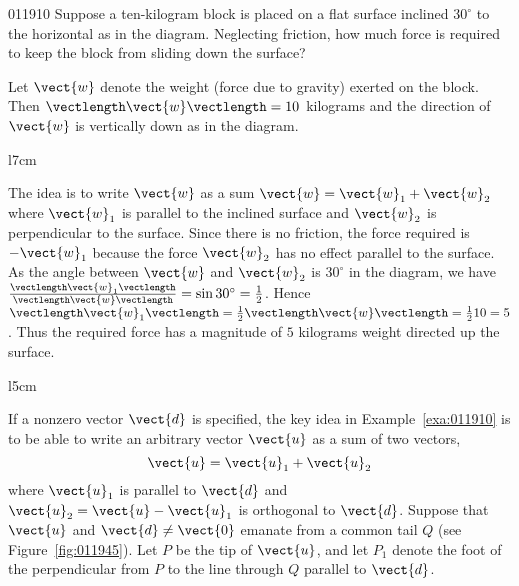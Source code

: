 \begin{example}{}{011910}
Suppose  a ten-kilogram block is placed on a flat surface inclined $30^{\circ}$  to the 
horizontal as in the diagram. Neglecting friction, how much force is 
required to keep the block from sliding down the surface?


\begin{solution}  Let $\vect{w}$ denote the weight (force due to gravity) exerted on the block. Then $\vectlength\vect{w}\vectlength = 10$ kilograms and the direction of $\vect{w}$ is vertically down as in the diagram. 


\begin{wrapfigure}[6]{l}{7cm} 
\centering

\end{wrapfigure}


The idea is to write $\vect{w}$ as a sum $\vect{w} = \vect{w}_{1} + \vect{w}_{2}$ where $\vect{w}_{1}$ is parallel to the inclined surface and $\vect{w}_{2}$ is perpendicular to the surface. Since there is no friction, the force required is $-\vect{w}_{1}$ because the force $\vect{w}_{2}$ has no effect parallel to the surface. As the angle between $\vect{w}$ and $\vect{w}_{2}$ is $30^{\circ}$  in the diagram, we have $\frac{\vectlength \vect{w}_{1} \vectlength}{\vectlength \vect{w} \vectlength} = \sin30^\circ = \frac{1}{2}$. Hence $\vectlength \vect{w}_{1} \vectlength = \frac{1}{2} \vectlength \vect{w} \vectlength = \frac{1}{2}10 = 5$. Thus the required force has a magnitude of $5$ kilograms weight directed up the surface.

\end{solution}
\end{example}


\begin{wrapfigure}[11]{l}{5cm}
\vspace{-1em}
\centering


\vspace*{-1em}\caption{\label{fig:011945}}
\end{wrapfigure}

If a nonzero vector $\vect{d}$ is specified, the key idea in Example~\ref{exa:011910} is to be able to write an arbitrary vector $\vect{u}$ as a sum of two vectors,
\begin{equation*}
\vect{u} = \vect{u}_{1} + \vect{u}_{2}
\end{equation*}
where $\vect{u}_{1}$ is parallel to $\vect{d}$ and $\vect{u}_{2} = \vect{u} - \vect{u}_{1}$ is orthogonal to $\vect{d}$. Suppose that $\vect{u}$ and $\vect{d} \neq \vect{0}$ emanate from a common tail $Q$ (see Figure~\ref{fig:011945}). Let $P$ be the tip of $\vect{u}$, and let $P_{1}$ denote the foot of the perpendicular from $P$ to the line through $Q$ parallel to $\vect{d}$. 

